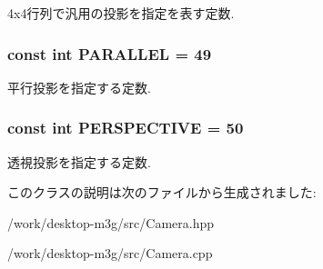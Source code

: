 4x4行列で汎用の投影を指定を表す定数. \hypertarget{classm3g_1_1Camera_d9630da0e9505afbb107c86229aa2f08}{
\subsubsection[{PARALLEL}]{\setlength{\rightskip}{0pt plus 5cm}const int {\bf PARALLEL} = 49}}
\label{classm3g_1_1Camera_d9630da0e9505afbb107c86229aa2f08}


平行投影を指定する定数. \hypertarget{classm3g_1_1Camera_e62e72bde93e7d7ceb482e7a8c40dcf5}{
\subsubsection[{PERSPECTIVE}]{\setlength{\rightskip}{0pt plus 5cm}const int {\bf PERSPECTIVE} = 50}}
\label{classm3g_1_1Camera_e62e72bde93e7d7ceb482e7a8c40dcf5}


透視投影を指定する定数. 

このクラスの説明は次のファイルから生成されました:\begin{CompactItemize}
\item 
/work/desktop-m3g/src/Camera.hpp\item 
/work/desktop-m3g/src/Camera.cpp\end{CompactItemize}
